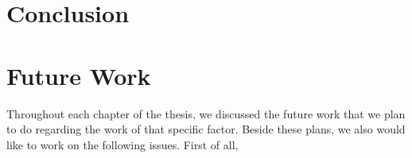 \section{Conclusion}
\label{DORSI:Conclusion}





\section{Future Work}
\label{DORSI:Future Work}
Throughout each chapter of the thesis, we discussed the future work that we plan to do regarding the work of that specific factor.
Beside these plans, we also would like to work on the following issues.
First of all, 











